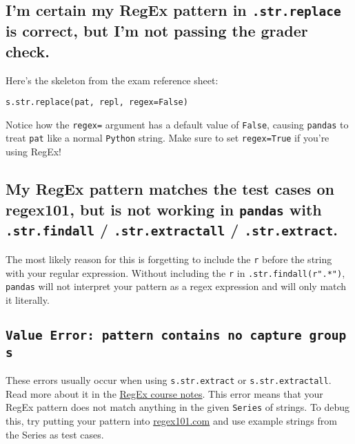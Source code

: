 \documentclass[
  letterpaper,
  DIV=11,
  numbers=noendperiod]{scrreprt}
\begin{document}
\subsection{\texorpdfstring{I'm certain my RegEx pattern in
\texttt{.str.replace} is correct, but I'm not passing the grader
check.}{I'm certain my RegEx pattern in .str.replace is correct, but I'm not passing the grader check.}}\label{im-certain-my-regex-pattern-in-.str.replace-is-correct-but-im-not-passing-the-grader-check.}

Here's the skeleton from the exam reference sheet:

\texttt{s.str.replace(pat,\ repl,\ regex=False)}

Notice how the \texttt{regex=} argument has a default value of
\texttt{False}, causing \texttt{pandas} to treat \texttt{pat} like a
normal \texttt{Python} string. Make sure to set \texttt{regex=True} if
you're using RegEx!

\subsection{\texorpdfstring{My RegEx pattern matches the test cases on
regex101, but is not working in \texttt{pandas} with
\texttt{.str.findall} / \texttt{.str.extractall} /
\texttt{.str.extract}.}{My RegEx pattern matches the test cases on regex101, but is not working in pandas with .str.findall / .str.extractall / .str.extract.}}\label{my-regex-pattern-matches-the-test-cases-on-regex101-but-is-not-working-in-pandas-with-.str.findall-.str.extractall-.str.extract.}

The most likely reason for this is forgetting to include the \texttt{r}
before the string with your regular expression. Without including the
\texttt{r} in \texttt{.str.findall(r".*")}, \texttt{pandas} will not
interpret your pattern as a regex expression and will only match it
literally.

\subsection{\texorpdfstring{\texttt{Value\ Error:\ pattern\ contains\ no\ capture\ groups}}{Value Error: pattern contains no capture groups}}\label{value-error-pattern-contains-no-capture-groups}

These errors usually occur when using \texttt{s.str.extract} or
\texttt{s.str.extractall}. Read more about it in the
\href{https://ds100.org/course-notes/regex/regex.html\#extraction-with-pandas}{RegEx
course notes}. This error means that your RegEx pattern does not match
anything in the given \texttt{Series} of strings. To debug this, try
putting your pattern into \href{https://regex101.com/}{regex101.com} and
use example strings from the Series as test cases.
\end{document}
